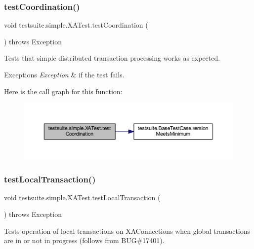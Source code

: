 \subsubsection{\texorpdfstring{test\+Coordination()}{testCoordination()}}
{\footnotesize\ttfamily void testsuite.\+simple.\+X\+A\+Test.\+test\+Coordination (\begin{DoxyParamCaption}{ }\end{DoxyParamCaption}) throws Exception}

Tests that simple distributed transaction processing works as expected.


\begin{DoxyExceptions}{Exceptions}
{\em Exception} & if the test fails. \\
\hline
\end{DoxyExceptions}
Here is the call graph for this function\+:
\nopagebreak
\begin{figure}[H]
\begin{center}
\leavevmode
\includegraphics[width=350pt]{classtestsuite_1_1simple_1_1_x_a_test_ac5d7e1565f556c03ca6ba2a11a6de5fa_cgraph}
\end{center}
\end{figure}
\mbox{\label{classtestsuite_1_1simple_1_1_x_a_test_aeb2dc398d807c4028e784f85aba58457}} 
\subsubsection{\texorpdfstring{test\+Local\+Transaction()}{testLocalTransaction()}}
{\footnotesize\ttfamily void testsuite.\+simple.\+X\+A\+Test.\+test\+Local\+Transaction (\begin{DoxyParamCaption}{ }\end{DoxyParamCaption}) throws Exception}

Tests operation of local transactions on X\+A\+Connections when global transactions are in or not in progress (follows from B\+UG\#17401).


